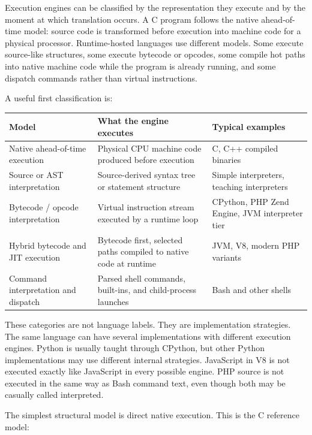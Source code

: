 \documentclass[a4paper,twoside]{report}
\begin{document}
Execution engines can be classified by the representation they execute and by the moment at which translation occurs. A C program follows the native ahead-of-time model: source code is transformed before execution into machine code for a physical processor. Runtime-hosted languages use different models. Some execute source-like structures, some execute bytecode or opcodes, some compile hot paths into native machine code while the program is already running, and some dispatch commands rather than virtual instructions.

A useful first classification is:

\begin{center}
\begin{tabular}{|p{}|p{}|p{}|}
\hline
\textbf{Model} & \textbf{What the engine executes} & \textbf{Typical examples} \\
\hline
Native ahead-of-time execution & Physical CPU machine code produced before execution & C, C++ compiled binaries \\
\hline
Source or AST interpretation & Source-derived syntax tree or statement structure & Simple interpreters, teaching interpreters \\
\hline
Bytecode / opcode interpretation & Virtual instruction stream executed by a runtime loop & CPython, PHP Zend Engine, JVM interpreter tier \\
\hline
Hybrid bytecode and JIT execution & Bytecode first, selected paths compiled to native code at runtime & JVM, V8, modern PHP variants \\
\hline
Command interpretation and dispatch & Parsed shell commands, built-ins, and child-process launches & Bash and other shells \\
\hline
\end{tabular}
\end{center}

These categories are not language labels. They are implementation strategies. The same language can have several implementations with different execution engines. Python is usually taught through CPython, but other Python implementations may use different internal strategies. JavaScript in V8 is not executed exactly like JavaScript in every possible engine. PHP source is not executed in the same way as Bash command text, even though both may be casually called interpreted.

The simplest structural model is direct native execution. This is the C reference model:
\end{document}
